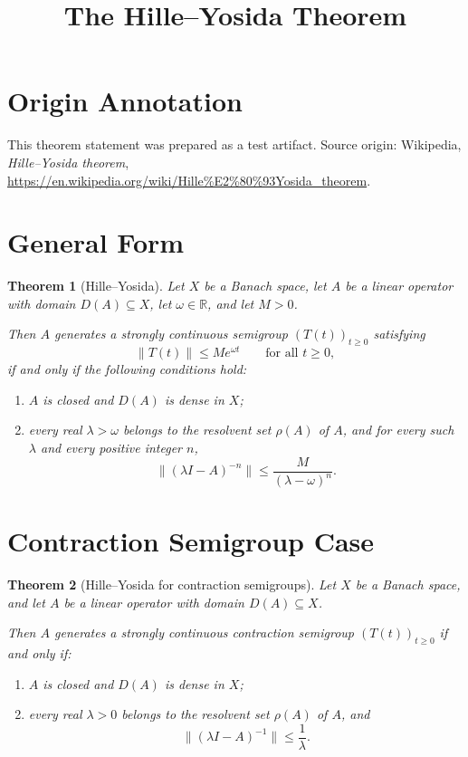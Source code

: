 \documentclass[11pt]{article}
\title{The Hille--Yosida Theorem}
\author{}
\date{}
\newtheorem{theorem}{Theorem}
\begin{document}
\maketitle

\section*{Origin Annotation}
This theorem statement was prepared as a test artifact.
Source origin: Wikipedia, \emph{Hille--Yosida theorem},
\url{https://en.wikipedia.org/wiki/Hille%E2%80%93Yosida_theorem}.

\section*{General Form}

\begin{theorem}[Hille--Yosida]
Let $X$ be a Banach space, let $A$ be a linear operator with domain
$D(A)\subseteq X$, let $\omega\in\mathbb{R}$, and let $M>0$.

Then $A$ generates a strongly continuous semigroup $(T(t))_{t\ge 0}$ satisfying
\[
\|T(t)\|\le M e^{\omega t}
\qquad\text{for all } t\ge 0,
\]
if and only if the following conditions hold:
\begin{enumerate}
    \item $A$ is closed and $D(A)$ is dense in $X$;
    \item every real $\lambda>\omega$ belongs to the resolvent set $\rho(A)$ of $A$, and for every such $\lambda$ and every positive integer $n$,
    \[
    \|(\lambda I-A)^{-n}\|
    \le
    \frac{M}{(\lambda-\omega)^n}.
    \]
\end{enumerate}
\end{theorem}

\section*{Contraction Semigroup Case}

\begin{theorem}[Hille--Yosida for contraction semigroups]
Let $X$ be a Banach space, and let $A$ be a linear operator with domain
$D(A)\subseteq X$.

Then $A$ generates a strongly continuous contraction semigroup
$(T(t))_{t\ge 0}$ if and only if:
\begin{enumerate}
    \item $A$ is closed and $D(A)$ is dense in $X$;
    \item every real $\lambda>0$ belongs to the resolvent set $\rho(A)$ of $A$, and
    \[
    \|(\lambda I-A)^{-1}\|\le \frac{1}{\lambda}.
    \]
\end{enumerate}
\end{theorem}
\end{document}
